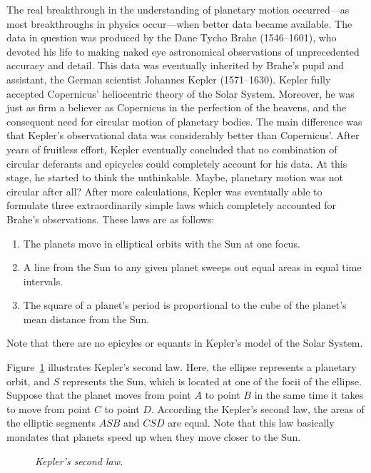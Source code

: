 The real breakthrough in the understanding of planetary motion occurred---as most
breakthroughs in physics occur---when better data became available. 
The data in question was produced by the Dane Tycho Brahe (1546--1601),
who devoted his life to making naked eye astronomical observations  of
unprecedented accuracy and detail. This data was eventually inherited by Brahe's pupil and
assistant, the German scientist Johannes Kepler (1571--1630). 
Kepler fully accepted Copernicus' heliocentric theory of the Solar System.
Moreover, he was just as firm a believer as Copernicus in the perfection of the heavens, and the
consequent need for
circular motion of planetary bodies. The main  difference was that Kepler's
observational data was considerably better than Copernicus'. After years
of fruitless effort, Kepler eventually concluded that no combination of circular 
deferants and epicycles could completely account for his data. At this stage,
he started to think the unthinkable. Maybe, planetary motion was not circular after all?
After more calculations, Kepler was eventually able to formulate three extraordinarily simple laws
which completely accounted for Brahe's observations. These laws are as follows:
\begin{enumerate}
\item The planets move in elliptical orbits with the Sun at one focus. 
\item A line from the Sun to any given planet sweeps out equal areas in equal time intervals. 
\item The square of a planet's period is proportional to the cube of the planet's mean distance from the Sun.
\end{enumerate}
Note that there are no epicyles or equants in Kepler's model of the Solar System.

Figure~\ref{f104} illustrates Kepler's second law. Here, the ellipse represents a planetary orbit, and
$S$ represents the Sun, which is located at one of the focii of the ellipse. Suppose that the
planet moves from point $A$ to point $B$ in the same time it takes to move from point $C$ to point $D$.
According the Kepler's second law, the areas of the elliptic segments $ASB$ and $CSD$ are equal. Note that this law
basically mandates that planets speed up when they move closer to the Sun. 

\begin{figure}
\epsfysize=2in
\centerline{}
\caption{\em Kepler's second law.}\label{f104}  
\end{figure}


